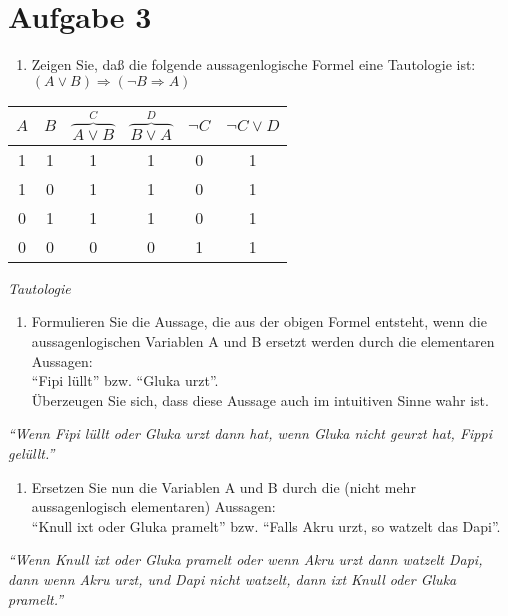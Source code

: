 \section*{Aufgabe 3}

\begin{enumerate}[label={a)}, leftmargin=*]
\item Zeigen Sie, daß die folgende aussagenlogische Formel eine Tautologie ist:\\
$(A \lor B) \Rightarrow (\lnot B \Rightarrow A)$
\end{enumerate}

\begin{table}[h]
\centering
\begin{tabular}{c|c|c|c|c|c}
$A$ & $B$ & $\overbrace{A \lor B}^{C}$ & $\overbrace{B \lor A}^{D}$ & $\lnot C$ & $\lnot C \lor D$\\
\hline
1 & 1 & 1 & 1 & 0 & 1\\
1 & 0 & 1 & 1 & 0 & 1\\
0 & 1 & 1 & 1 & 0 & 1\\
0 & 0 & 0 & 0 & 1 & 1\\
\end{tabular}
\end{table}

\textit{Tautologie}

\begin{enumerate}[label={b)}, leftmargin=*]
\item Formulieren Sie die Aussage, die aus der obigen Formel entsteht, wenn die aussagenlogischen Variablen A und B ersetzt werden durch die elementaren Aussagen:\\
    ``Fipi lüllt'' bzw. ``Gluka urzt''.\\
    Überzeugen Sie sich, dass diese Aussage auch im intuitiven Sinne wahr ist.
\end{enumerate}

\textit{``Wenn Fipi lüllt oder Gluka urzt dann hat, wenn Gluka nicht geurzt hat, Fippi gelüllt.''}

\begin{enumerate}[label={c)}, leftmargin=*]
\item Ersetzen Sie nun die Variablen A und B durch die (nicht mehr aussagenlogisch elementaren)
Aussagen:\\
``Knull ixt oder Gluka pramelt'' bzw. ``Falls Akru urzt, so watzelt das Dapi''.
\end{enumerate}

\textit{``Wenn Knull ixt oder Gluka pramelt oder wenn Akru urzt dann watzelt Dapi, dann wenn Akru urzt, und Dapi nicht watzelt, dann ixt Knull oder Gluka pramelt.''}

